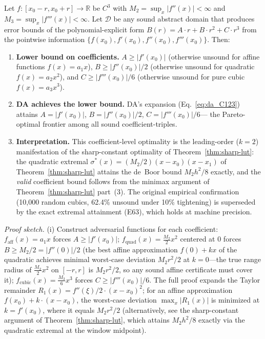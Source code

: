 \vspace{4pt}
\begin{corollary}[DA Coefficient Optimality as the $k=2$ Special Case]
\label{cor:da-optimality}
Let $f: [x_0-r, x_0+r] \to \mathbb{R}$ be $C^3$ with
$M_2 = \sup_{x} |f''(x)| < \infty$ and
$M_3 = \sup_{x} |f'''(x)| < \infty$.
Let $\mathcal{D}$ be any sound abstract domain that produces
error bounds of the polynomial-explicit form
$B(r) = A \cdot r + B \cdot r^2 + C \cdot r^3$
from the pointwise information
$\{f(x_0), f'(x_0), f''(x_0), f'''(x_0)\}$.
Then:
\begin{enumerate}[label=(\roman*)]
    \item \textbf{Lower bound on coefficients.}
    $A \geq |f'(x_0)|$ (otherwise unsound for affine functions
    $f(x) = a_1 x$), $B \geq |f''(x_0)|/2$ (otherwise unsound for
    quadratic $f(x) = a_2 x^2$), and
    $C \geq |f'''(x_0)|/6$ (otherwise unsound for pure cubic
    $f(x) = a_3 x^3$).
    \item \textbf{DA achieves the lower bound.}
    DA's expansion (Eq.~\ref{eq:da_C123}) attains
    $A = |f'(x_0)|$, $B = |f''(x_0)|/2$, $C = |f'''(x_0)|/6$---
    the Pareto-optimal frontier among all sound coefficient-triples.
    \item \textbf{Interpretation.} This coefficient-level optimality is the
    leading-order ($k=2$) manifestation of the sharp-constant optimality
    of Theorem~\ref{thm:sharp-lut}: the quadratic extremal
    $\sigma^{*}(x) = (M_2/2)(x - x_0)(x - x_1)$ of
    Theorem~\ref{thm:sharp-lut} attains the de~Boor bound $M_2 h^2/8$
    exactly, and the \emph{valid} coefficient bound follows from the
    minimax argument of Theorem~\ref{thm:sharp-lut} part~(3). The original
    empirical confirmation (10,000 random cubics, 62.4\% unsound under
    10\% tightening) is superseded by the exact extremal attainment
    (E63), which holds at machine precision.
\end{enumerate}
\end{corollary}

\vspace{2pt}
\noindent\textit{Proof sketch.}
(i) Construct adversarial functions for each coefficient:
$f_{\text{aff}}(x) = a_1 x$ forces $A \geq |f'(x_0)|$;
$f_{\text{quad}}(x) = \frac{M_2}{2} x^2$ centered at 0 forces
$B \geq M_2/2 = |f''(0)|/2$ (the best affine approximation
$f(0) + kx$ of the quadratic achieves minimal worst-case deviation
$M_2 r^2/2$ at $k = 0$---the true range radius of
$\frac{M_2}{2}x^2$ on $[-r, r]$ is $M_2 r^2/2$, so any sound affine
certificate must cover it);
$f_{\text{cubic}}(x) = \frac{M_3}{6} x^3$ forces
$C \geq |f'''(x_0)|/6$. The full proof expands the Taylor remainder
$R_1(x) = f''(\xi)/2 \cdot (x-x_0)^2$; for an affine approximation
$f(x_0) + k \cdot (x-x_0)$, the worst-case deviation $\max_x |R_1(x)|$
is minimized at $k = f'(x_0)$, where it equals $M_2 r^2 / 2$
(alternatively, see the sharp-constant argument of
Theorem~\ref{thm:sharp-lut}, which attains $M_2 h^2/8$ exactly via the
quadratic extremal at the window midpoint).

